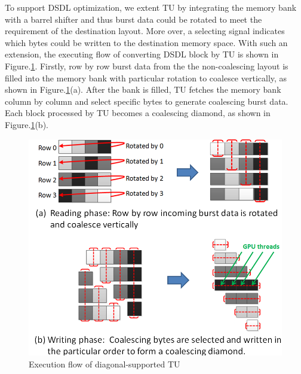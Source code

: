 \documentclass[10pt,journal,compsoc]{IEEEtran}
\begin{document}
To support DSDL optimization, we extent TU by integrating the memory bank with a barrel shifter and thus burst data could be rotated to meet the requirement of the destination layout. More over, a selecting signal indicates which bytes could be written to the destination memory space. With such an extension, the executing flow of converting DSDL block by TU is shown in Figure.\ref{fig:Diagonal_TU}. Firstly, row by row burst data from the the non-coalescing layout is filled into the memory bank with particular rotation to coalesce vertically, as shown in Figure.\ref{fig:Diagonal_TU}(a). After the bank is filled, TU fetches the memory bank column by column and select specific bytes to generate coalescing burst data. Each block processed by TU becomes a coalescing diamond, as shown in Figure.\ref{fig:Diagonal_TU}(b).

\begin{figure}[t]
\begin{center}
\graphicspath{{picture/}}

\includegraphics[scale=0.33]{tunewnew}

\caption{Execution flow of diagonal-supported TU}
\label{fig:Diagonal_TU}
\end{center}
\end{figure}
\end{document}
